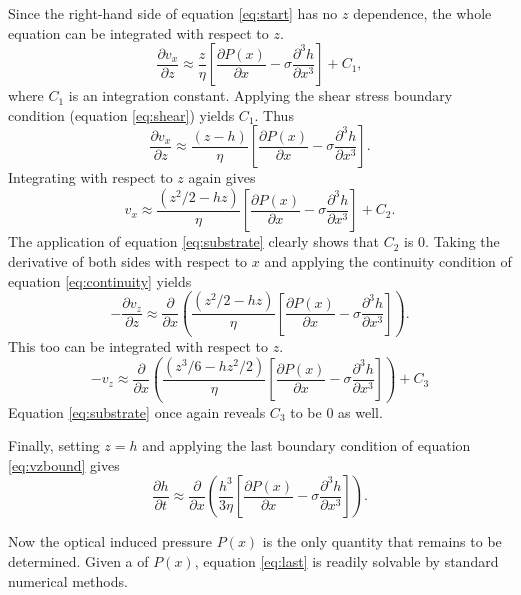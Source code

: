 \documentclass[aps, prl, twocolumn, groupedaddress]{revtex4-1}
\begin{document}
Since the right-hand side of equation \ref{eq:start} has no $z$
dependence, the whole equation can be integrated with respect to $z$.
\begin{equation}
\frac{\partial v_x}{\partial z}  \approx \frac{z}{\eta}\left[\frac{\partial
P(x)}{\partial x}-\sigma\frac{\partial^3 h}{\partial x^3}\right]+C_1 \mathrm{,}
\end{equation}
where $C_1$ is an integration constant. Applying the shear stress
boundary condition (equation \ref{eq:shear}) yields $C_1$. Thus
\begin{equation}
\frac{\partial v_x}{\partial z} \approx \frac{\left(z-h\right)}{\eta}\left[\frac{\partial
P(x)}{\partial x}-\sigma\frac{\partial^3 h}{\partial x^3}\right] \mathrm{.}
\end{equation}
Integrating with respect to $z$ again gives
\begin{equation}
v_x \approx \frac{\left(z^2/2-hz\right)}{\eta}\left[\frac{\partial P(x)}{\partial
x}-\sigma\frac{\partial^3 h}{\partial x^3}\right]+C_2 \mathrm{.}
\end{equation}
The application of equation \ref{eq:substrate} clearly shows that $C_2$ is 0. Taking
the derivative of both sides with respect to $x$ and applying the
continuity condition of equation \ref{eq:continuity} yields
\begin{equation}
-\frac{\partial v_z}{\partial z}  \approx \frac{\partial}{\partial x}
\left(\frac{\left(z^2/2-hz\right)}{\eta}\left[\frac{\partial P(x)}{\partial
x}-\sigma\frac{\partial^3 h}{\partial x^3}\right]\right) \mathrm{.}
\end{equation}
This too can be integrated with respect to $z$.
\begin{equation}
-v_z \approx \frac{\partial}{\partial
x}\left(\frac{\left(z^3/6-hz^2/2\right)}{\eta}\left[\frac{\partial P(x)}{\partial
x}-\sigma\frac{\partial^3 h}{\partial x^3}\right]\right)+C_3 \label{eq:almost}
\end{equation}
Equation \ref{eq:substrate} once again reveals $C_3$ to be $0$ as well.

Finally, setting $z = h$ and applying the last boundary condition of equation
\ref{eq:vzbound} gives
\begin{equation}
\label{eq:last}
\frac{\partial h}{\partial t} \approx \frac{\partial}{\partial
x}\left(\frac{h^3}{3\eta}\left[\frac{\partial P(x)}{\partial x}-\sigma\frac{\partial^3
h}{\partial x^3}\right]\right) \mathrm{.}
\end{equation}

Now the optical induced pressure $P(x)$ is the only quantity that remains
to be determined. Given a of $P(x)$, equation \ref{eq:last} is
readily solvable by standard numerical methods.
\end{document}

